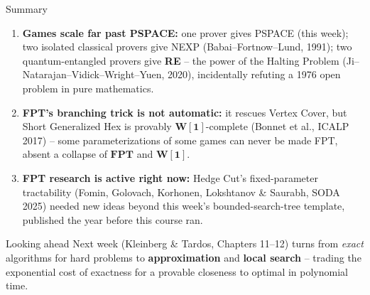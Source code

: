 \documentclass[11pt,aspectratio=169]{beamer}
\begin{document}
\begin{frame}{Summary}
  \small
  \begin{enumerate}
    \item \textbf{Games scale far past PSPACE:} one prover gives PSPACE (this week);
    two isolated classical provers give NEXP (Babai--Fortnow--Lund, 1991); two
    quantum-entangled provers give \textbf{RE} -- the power of the Halting Problem
    (Ji--Natarajan--Vidick--Wright--Yuen, 2020), incidentally refuting a 1976 open
    problem in pure mathematics.
    \item \textbf{FPT's branching trick is not automatic:} it rescues Vertex Cover,
    but Short Generalized Hex is provably $\mathbf{W[1]}$-complete (Bonnet et al.,
    ICALP 2017) -- some parameterizations of some games can never be made FPT, absent
    a collapse of $\mathbf{FPT}$ and $\mathbf{W[1]}$.
    \item \textbf{FPT research is active right now:} Hedge Cut's fixed-parameter
    tractability (Fomin, Golovach, Korhonen, Lokshtanov \& Saurabh, SODA 2025) needed
    new ideas beyond this week's bounded-search-tree template, published the year
    before this course ran.
  \end{enumerate}
  \begin{alertblock}{Looking ahead}
    Next week (Kleinberg \& Tardos, Chapters 11--12) turns from \emph{exact}
    algorithms for hard problems to \textbf{approximation} and \textbf{local search}
    -- trading the exponential cost of exactness for a provable closeness to optimal
    in polynomial time.
  \end{alertblock}
\end{frame}
\end{document}
